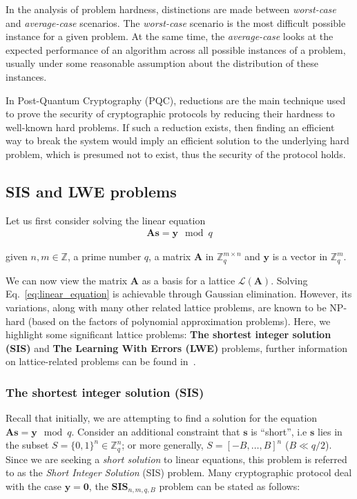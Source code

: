 \documentclass[cryptography,review,submit,pdftex,moreauthors,amsmath,amssymb,aps,strict]{Definitions/mdpi}
\begin{document}
In the analysis of problem hardness, distinctions are made between \textit{worst-case} and \textit{average-case} scenarios. The \textit{worst-case} scenario is the most difficult possible instance for a given problem. At the same time, the \textit{average-case} looks at the expected performance of an algorithm across all possible instances of a problem, usually under some reasonable assumption about the distribution of these instances. 

In Post-Quantum Cryptography (PQC), reductions are the main technique used to prove the security of cryptographic protocols by reducing their hardness to well-known hard problems. If such a reduction exists, then finding an efficient way to break the system would imply an efficient solution to the underlying hard problem, which is presumed not to exist, thus the security of the protocol holds.



\subsection{SIS and LWE problems}
Let us first consider solving the linear equation
\begin{align}
    \mathbf{A}\mathbf{s} = \mathbf{y}\mod q \label{eq:linear_equation}
\end{align}

given $n,m \in \mathbb{Z}$, a prime number $q$, a matrix $\mathbf{A}$ in $\mathbb{Z}^{m\times n}_q$ and $\mathbf{y}$ is a vector in $\mathbb{Z}^m_q$. 

We can now view the matrix $\mathbf{A}$ as a basis for a lattice $\mathcal{L}(\mathbf{A})$. Solving Eq.~\eqref{eq:linear_equation} is achievable through Gaussian elimination. However, its variations, along with many other related lattice problems, are known to be NP-hard (based on the factors of polynomial approximation problems). Here, we highlight some significant lattice problems: \textbf{The shortest integer solution (SIS)} and \textbf{The Learning With Errors (LWE)} problems, further information on lattice-related problems can be found in~\cite{Pei16}.

\subsubsection{The shortest integer solution (SIS)}

Recall that initially, we are attempting to find a solution for the equation $\mathbf{A}\mathbf{s} = \mathbf{y} \mod q$. Consider an additional constraint that $\mathbf{s}$ is ``short'', i.e $\mathbf{s}$ lies in the subset $S=\{0,1\}^n\in\mathbb{Z}^n_q$; or more generally, $S=[-B,\dots, B]^n$  ($B\ll q/2$). Since we are seeking a \textit{short solution} to linear equations, this problem is referred to as the \textit{Short Integer Solution} (SIS) problem. Many cryptographic protocol deal with the case $\mathbf{y}=\mathbf{0}$, the $\mathbf{SIS}_{n,m,q,B}$ problem can be stated as follows:
\end{document}
